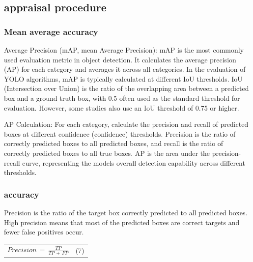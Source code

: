 \documentclass[
]{article}
\newcounter{none} %
\begin{document}
\subsection{appraisal procedure}\label{appraisal-procedure}

\subsubsection{Mean average accuracy}\label{mean-average-accuracy}

Average Precision (mAP, mean Average Precision): mAP is the most
commonly used evaluation metric in object detection. It calculates the
average precision (AP) for each category and averages it across all
categories. In the evaluation of YOLO algorithms, mAP is typically
calculated at different IoU thresholds. IoU (Intersection over Union) is
the ratio of the overlapping area between a predicted box and a ground
truth box, with 0.5 often used as the standard threshold for evaluation.
However, some studies also use an IoU threshold of 0.75 or higher.

AP Calculation: For each category, calculate the precision and recall of
predicted boxes at different confidence (confidence) thresholds.
Precision is the ratio of correctly predicted boxes to all predicted
boxes, and recall is the ratio of correctly predicted boxes to all true
boxes. AP is the area under the precision-recall curve, representing the
model\textquotesingle s overall detection capability across different
thresholds.

\subsubsection{accuracy}\label{accuracy}

Precision is the ratio of the target box correctly predicted to all
predicted boxes. High precision means that most of the predicted boxes
are correct targets and fewer false positives occur.

{\def\LTcaptype{none} %
\begin{longtable}[]{@{}
  >{\raggedright\arraybackslash}p{}
  >{\centering\arraybackslash}p{}@{}}
\toprule\noalign{}
\endhead
\bottomrule\noalign{}
\endlastfoot
\(Precision\, = \,\frac{TP}{TP\, + \, FP}\) & (7) \\
\end{longtable}
}
\end{document}
